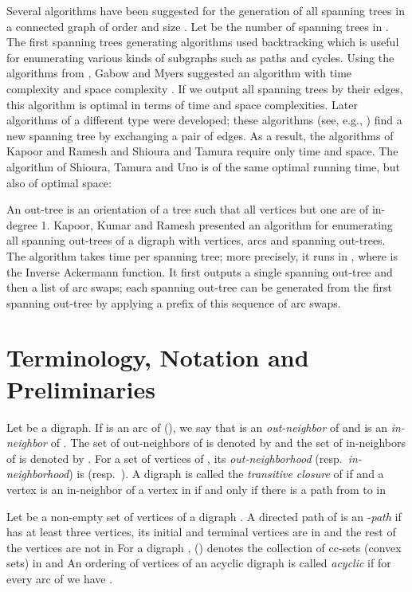 \documentclass[11pt]{article}
\newcommand{\2}{\vspace{0.2 cm}}
\begin{document}
Several algorithms have been suggested for the generation of all spanning
trees in a connected graph  of order  and size . Let  be
the number of spanning trees in . The first spanning trees
generating algorithms \cite{gabowSIAMJC7,mintyIEEETCT12,readN5} used
backtracking which is useful for enumerating various kinds of
subgraphs such as paths and cycles. Using the algorithms from
\cite{mintyIEEETCT12,readN5}, Gabow and Myers \cite{gabowSIAMJC7}
suggested an algorithm with time complexity  and space
complexity . If we output all spanning trees by their edges,
this algorithm is optimal in terms of time and space complexities.
Later algorithms of a different type were developed; these algorithms
(see, e.g., \cite{kapoorSIAMJC24,shiouraJORSJ38,shiouraSIAMJC26})
find a new spanning tree by exchanging a pair of edges. As a result,
the algorithms of Kapoor and Ramesh \cite{kapoorSIAMJC24} and
Shioura and Tamura \cite{shiouraJORSJ38} require only 
time and  space. The algorithm of Shioura, Tamura and Uno
\cite{shiouraSIAMJC26} is of the same optimal running time, but also
of optimal space: 



An out-tree is an orientation of a tree such that all vertices but
one are of in-degree 1. Kapoor, Kumar and Ramesh \cite{kapoorA27}
presented an algorithm for enumerating all spanning out-trees of a
digraph with  vertices,  arcs and  spanning out-trees. The
algorithm takes  time per spanning tree; more precisely,
it runs in , where  is the
Inverse Ackermann function. It first outputs a single spanning
out-tree and then a list of arc swaps; each spanning out-tree can be
generated from the first spanning out-tree by applying a prefix of
this sequence of arc swaps.



\section{Terminology, Notation and Preliminaries}

Let  be a digraph. If  is an arc of  (), we
say that  is an {\em out-neighbor} of  and  is an {\em
in-neighbor} of . The set of out-neighbors of  is denoted by
 and the set of in-neighbors of  is denoted by
. For a set  of vertices of , its {\em
out-neighborhood} (resp.\ {\em in-neighborhood}) is  (resp.\ ). A digraph  is called the {\em transitive closure} of
 if  and a vertex  is an in-neighbor of a
vertex  in  if and only if there is a path from  to
 in 

Let  be a non-empty set of vertices of a digraph . A directed
path  of  is an -{\em path} if  has at least three
vertices, its initial and terminal vertices are in  and the rest
of the vertices are not in   For a digraph , 
() denotes the collection of cc-sets (convex sets) in 
 and  An ordering
 of vertices of an acyclic digraph  is
called {\em acyclic} if for every arc  of  we have
.
\end{document}
